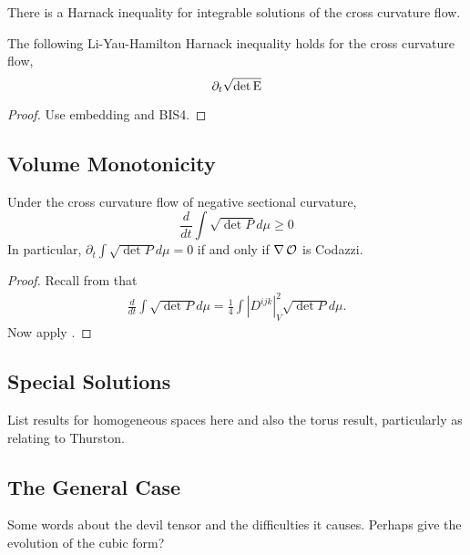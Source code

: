 \documentclass[a4paper, 12pt]{amsart}
\begin{document}
There is a Harnack inequality for integrable solutions of the cross curvature flow.

\begin{lemma}
\label{lem:harnack}

The following Li-Yau-Hamilton Harnack inequality holds for the cross curvature flow,
\[
\partial_t \sqrt{\det \operatorname{E}}
\]
\end{lemma}

\begin{proof}
{\color{red}Use embedding and BIS4.}
\end{proof}

\subsection{Volume Monotonicity}
\label{subsec:xcf_volume}

\begin{lemma}
\label{lem:volume_monotonicity}

Under the cross curvature flow of negative sectional curvature,
\[
\frac{d}{dt}\int \sqrt{\det P}d\mu \geq 0
\]
In particular, \(\partial_t \int \sqrt{\det P}d\mu = 0\) if and only if \(\nabla \operatorname{\mathcal{O}}\) is Codazzi.
\end{lemma}

\begin{proof}
Recall from \cite[page 6]{MR2055396} that
\begin{align}
\frac{d}{dt}\int \sqrt{\det P}d\mu=\frac{1}{4}\int |D^{ijk}|_V^2\sqrt{\det P}d\mu.
\end{align}
Now apply .
\end{proof}

\subsection{Special Solutions}
\label{subsec:xcf_special}


{\color{red} List results for homogeneous spaces here and also the torus result, particularly as relating to Thurston.}

\subsection{The General Case}
\label{subsec:xcf_general}

{\color{red} Some words about the devil tensor and the difficulties it causes. Perhaps give the evolution of the cubic form?}

\section*{}

\printbibliography
\end{document}
